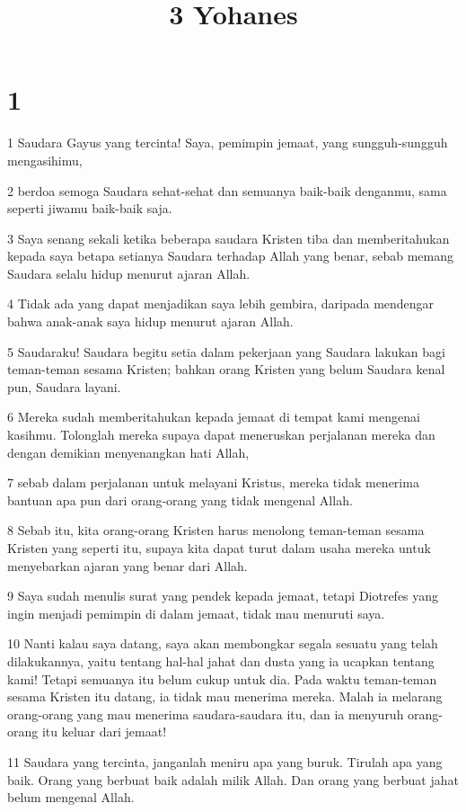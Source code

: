 

\title{3 Yohanes}


\chapter{1}

\par 1 Saudara Gayus yang tercinta! Saya, pemimpin jemaat, yang sungguh-sungguh mengasihimu,
\par 2 berdoa semoga Saudara sehat-sehat dan semuanya baik-baik denganmu, sama seperti jiwamu baik-baik saja.
\par 3 Saya senang sekali ketika beberapa saudara Kristen tiba dan memberitahukan kepada saya betapa setianya Saudara terhadap Allah yang benar, sebab memang Saudara selalu hidup menurut ajaran Allah.
\par 4 Tidak ada yang dapat menjadikan saya lebih gembira, daripada mendengar bahwa anak-anak saya hidup menurut ajaran Allah.
\par 5 Saudaraku! Saudara begitu setia dalam pekerjaan yang Saudara lakukan bagi teman-teman sesama Kristen; bahkan orang Kristen yang belum Saudara kenal pun, Saudara layani.
\par 6 Mereka sudah memberitahukan kepada jemaat di tempat kami mengenai kasihmu. Tolonglah mereka supaya dapat meneruskan perjalanan mereka dan dengan demikian menyenangkan hati Allah,
\par 7 sebab dalam perjalanan untuk melayani Kristus, mereka tidak menerima bantuan apa pun dari orang-orang yang tidak mengenal Allah.
\par 8 Sebab itu, kita orang-orang Kristen harus menolong teman-teman sesama Kristen yang seperti itu, supaya kita dapat turut dalam usaha mereka untuk menyebarkan ajaran yang benar dari Allah.
\par 9 Saya sudah menulis surat yang pendek kepada jemaat, tetapi Diotrefes yang ingin menjadi pemimpin di dalam jemaat, tidak mau menuruti saya.
\par 10 Nanti kalau saya datang, saya akan membongkar segala sesuatu yang telah dilakukannya, yaitu tentang hal-hal jahat dan dusta yang ia ucapkan tentang kami! Tetapi semuanya itu belum cukup untuk dia. Pada waktu teman-teman sesama Kristen itu datang, ia tidak mau menerima mereka. Malah ia melarang orang-orang yang mau menerima saudara-saudara itu, dan ia menyuruh orang-orang itu keluar dari jemaat!
\par 11 Saudara yang tercinta, janganlah meniru apa yang buruk. Tirulah apa yang baik. Orang yang berbuat baik adalah milik Allah. Dan orang yang berbuat jahat belum mengenal Allah.
